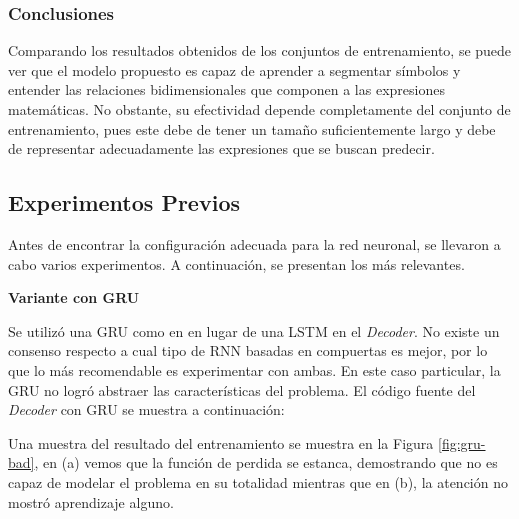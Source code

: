 \subsubsection{Conclusiones}

Comparando los resultados obtenidos de los conjuntos de entrenamiento, se puede ver que el modelo propuesto es capaz de aprender a segmentar símbolos y entender las relaciones bidimensionales que componen a las expresiones matemáticas. No obstante, su efectividad depende completamente del conjunto de entrenamiento, pues este debe de tener un tamaño suficientemente largo y debe de representar adecuadamente las expresiones que se buscan predecir.


\subsection{Experimentos Previos}

Antes de encontrar la configuración adecuada para la red neuronal, se llevaron a cabo varios experimentos. A continuación, se presentan los más relevantes.

\vspace{1em}
\textbf{Variante con GRU}
\vspace{1em}

Se utilizó una GRU como en \cite{gru} en lugar de una LSTM en el \textit{Decoder}. No existe un consenso respecto a cual tipo de RNN basadas en compuertas es mejor, por lo que lo más recomendable es experimentar con ambas. En este caso particular, la GRU no logró abstraer las características del problema. El código fuente del \textit{Decoder} con GRU se muestra a continuación:



Una muestra del resultado del entrenamiento se muestra en la Figura \ref{fig:gru-bad}, en (a) vemos que la función de perdida se estanca, demostrando que no es capaz de modelar el problema en su totalidad mientras que en (b), la atención no mostró aprendizaje alguno.

